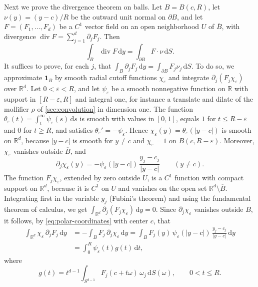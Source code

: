 Next we prove the divergence theorem on balls. Let $B=B(c,R)$, let $\nu(y)=(y-c)/R$ be the outward unit normal on $\partial B$, and let $F=(F_1,\ldots,F_d)$ be a $C^1$ vector field on an open neighborhood $U$ of $\overline B$, with divergence $\operatorname{div}F=\sum_{j=1}^d\partial_jF_j$. Then
\begin{equation}\label{eq:ball-divergence}
 \int_B\operatorname{div}F\,\mathrm dy=\int_{\partial B}F\cdot\nu\,\mathrm dS.
\end{equation}
It suffices to prove, for each $j$, that $\int_B\partial_jF_j\,\mathrm dy=\int_{\partial B}F_j\nu_j\,\mathrm dS$. To do so, we approximate $\mathbf1_B$ by smooth radial cutoff functions $\chi_\varepsilon$ and integrate $\partial_j(F_j\chi_\varepsilon)$ over $\mathbb R^d$. Let $0<\varepsilon<R$, and let $\psi_\varepsilon$ be a smooth nonnegative function on $\mathbb R$ with support in $[R-\varepsilon,R]$ and integral one, for instance a translate and dilate of the mollifier $\rho$ of \cref{sec:convolution} in dimension one. The function $\theta_\varepsilon(t)=\int_t^\infty\psi_\varepsilon(s)\,\mathrm ds$ is smooth with values in $[0,1]$, equals $1$ for $t\leq R-\varepsilon$ and $0$ for $t\geq R$, and satisfies $\theta_\varepsilon'=-\psi_\varepsilon$. Hence $\chi_\varepsilon(y)=\theta_\varepsilon(|y-c|)$ is smooth on $\mathbb R^d$, because $|y-c|$ is smooth for $y\neq c$ and $\chi_\varepsilon=1$ on $B(c,R-\varepsilon)$. Moreover, $\chi_\varepsilon$ vanishes outside $\overline B$, and
\[
 \partial_j\chi_\varepsilon(y)=-\psi_\varepsilon(|y-c|)\,\frac{y_j-c_j}{|y-c|}\qquad(y\neq c).
\]
The function $F_j\chi_\varepsilon$, extended by zero outside $U$, is a $C^1$ function with compact support on $\mathbb R^d$, because it is $C^1$ on $U$ and vanishes on the open set $\mathbb R^d\setminus\overline B$. Integrating first in the variable $y_j$ (Fubini's theorem) and using the fundamental theorem of calculus, we get $\int_{\mathbb R^d}\partial_j(F_j\chi_\varepsilon)\,\mathrm dy=0$. Since $\partial_j\chi_\varepsilon$ vanishes outside $B$, it follows, by \eqref{eq:polar-coordinates} with center $c$, that
\begin{align*}
 \int_{\mathbb R^d}\chi_\varepsilon\,\partial_jF_j\,\mathrm dy&=-\int_BF_j\,\partial_j\chi_\varepsilon\,\mathrm dy=\int_BF_j(y)\,\psi_\varepsilon(|y-c|)\,\frac{y_j-c_j}{|y-c|}\,\mathrm dy\\
 &=\int_0^R\psi_\varepsilon(t)g(t)\,\mathrm dt,
\end{align*}
where
\[
 g(t)=t^{d-1}\int_{S^{d-1}}F_j(c+t\omega)\,\omega_j\,\mathrm dS(\omega),\qquad0<t\leq R.
\]
